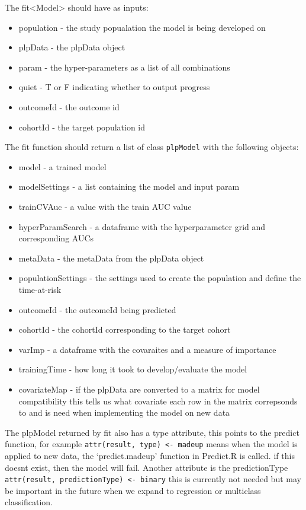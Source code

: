\documentclass[
]{article}
\providecommand{\tightlist}{%
  \setlength{\itemsep}{0pt}\setlength{\parskip}{0pt}}
\begin{document}
The fit\textless Model\textgreater{} should have as inputs:

\begin{itemize}
\tightlist
\item
  population - the study popualation the model is being developed on
\item
  plpData - the plpData object
\item
  param - the hyper-parameters as a list of all combinations
\item
  quiet - T or F indicating whether to output progress
\item
  outcomeId - the outcome id
\item
  cohortId - the target population id
\end{itemize}

The fit function should return a list of class \texttt{plpModel} with
the following objects:

\begin{itemize}
\tightlist
\item
  model - a trained model
\item
  modelSettings - a list containing the model and input param
\item
  trainCVAuc - a value with the train AUC value
\item
  hyperParamSearch - a dataframe with the hyperparameter grid and
  corresponding AUCs
\item
  metaData - the metaData from the plpData object
\item
  populationSettings - the settings used to create the population and
  define the time-at-risk
\item
  outcomeId - the outcomeId being predicted
\item
  cohortId - the cohortId corresponding to the target cohort
\item
  varImp - a dataframe with the covaraites and a measure of importance
\item
  trainingTime - how long it took to develop/evaluate the model
\item
  covariateMap - if the plpData are converted to a matrix for model
  compatibility this tells us what covariate each row in the matrix
  correpsonds to and is need when implementing the model on new data
\end{itemize}

The plpModel returned by fit also has a type attribute, this points to
the predict function, for example
\texttt{attr(result,\ \textquotesingle{}type\textquotesingle{})\ \textless{}-\ \textquotesingle{}madeup\textquotesingle{}}
means when the model is applied to new data, the `predict.madeup'
function in Predict.R is called. if this doesnt exist, then the model
will fail. Another attribute is the predictionType
\texttt{attr(result,\ \textquotesingle{}predictionType\textquotesingle{})\ \textless{}-\ \textquotesingle{}binary\textquotesingle{}}
this is currently not needed but may be important in the future when we
expand to regression or multiclass classification.
\end{document}
